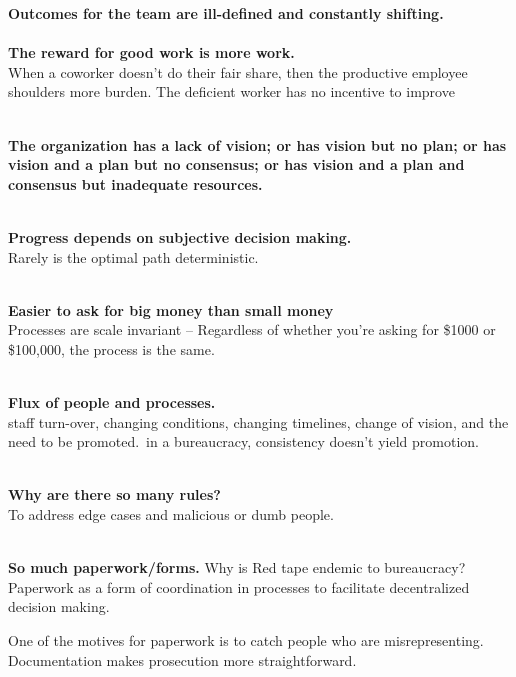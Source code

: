 \textbf{Outcomes for the team are ill-defined and constantly shifting.}\\

\ \\

\textbf{The reward for good work is more work.}\\
When a coworker doesn't do their fair share, then the productive employee shoulders more burden. The deficient worker has no incentive to improve

\ \\

\textbf{The organization has a lack of vision; or has vision but no plan; or has vision and a plan but no consensus; or has vision and a plan and consensus but inadequate resources.}

\ \\

\textbf{Progress depends on subjective decision making.}\\
Rarely is the optimal path deterministic. 

\ \\

\textbf{Easier to ask for big money than small money}\\
Processes are scale invariant -- Regardless of whether you're asking for \$1000 or \$100,000, the process is the same. 

\ \\

\textbf{Flux of people and processes.} \\
staff turn-over, changing conditions, changing timelines, change of vision, and the need to be promoted. in a bureaucracy, consistency doesn't yield promotion.

\ \\

\textbf{Why are there so many rules?}\\
To address edge cases and malicious or dumb people.

\ \\

\textbf{So much paperwork/forms.}
Why is Red tape endemic to bureaucracy?\\
Paperwork as a form of coordination in processes to facilitate decentralized decision making. 

One of the motives for paperwork is to catch people who are misrepresenting. Documentation makes prosecution more straightforward.

\ \\

